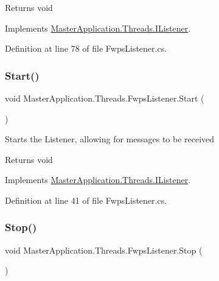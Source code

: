 \begin{DoxyReturn}{Returns}
void
\end{DoxyReturn}


Implements \mbox{\hyperlink{interface_master_application_1_1_threads_1_1_i_listener_a1bf04b1440221f92c0ba0f3f674d4bce}{Master\+Application.\+Threads.\+I\+Listener}}.



Definition at line 78 of file Fwps\+Listener.\+cs.

\mbox{\label{class_master_application_1_1_threads_1_1_fwps_listener_abb282c4f8d463224c65582c91dd1a5bb}} 
\subsubsection{\texorpdfstring{Start()}{Start()}}
{\footnotesize\ttfamily void Master\+Application.\+Threads.\+Fwps\+Listener.\+Start (\begin{DoxyParamCaption}{ }\end{DoxyParamCaption})}



Starts the Listener, allowing for messages to be received 

\begin{DoxyReturn}{Returns}
void
\end{DoxyReturn}


Implements \mbox{\hyperlink{interface_master_application_1_1_threads_1_1_i_listener_ae413bfc6d77762470fa78203cd07271b}{Master\+Application.\+Threads.\+I\+Listener}}.



Definition at line 41 of file Fwps\+Listener.\+cs.

\mbox{\label{class_master_application_1_1_threads_1_1_fwps_listener_a590df6f1cf3d72935ba0aa2e26ed6174}} 
\subsubsection{\texorpdfstring{Stop()}{Stop()}}
{\footnotesize\ttfamily void Master\+Application.\+Threads.\+Fwps\+Listener.\+Stop (\begin{DoxyParamCaption}{ }\end{DoxyParamCaption})}



